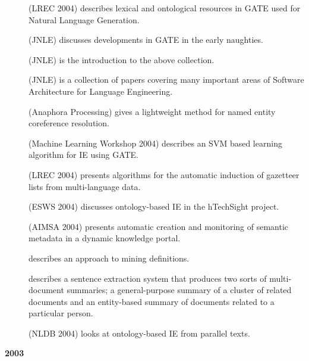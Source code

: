 \begin{description}

\item[\cite{Bon04a}] (LREC 2004) describes lexical and ontological resources
in GATE used for Natural Language Generation.
%
\item[\cite{Bon04b}] (JNLE) discusses developments in GATE in the early
naughties.
%
\item[\cite{Cun04b}] (JNLE) is the introduction to the above collection.
%
\item[\cite{Cun04a}] (JNLE) is a collection of papers covering many
important areas of Software Architecture for Language Engineering.
%
\item[\cite{Dim04a}] (Anaphora Processing) gives a lightweight method for
named entity coreference resolution.
%
\item[\cite{Yaoyong04}] (Machine Learning Workshop 2004)
describes an SVM based learning algorithm for IE using GATE.
%
\item[\cite{May04a}] (LREC 2004) presents algorithms for the automatic
induction of gazetteer lists from multi-language data.
%
\item[\cite{May04c}] (ESWS 2004) discusses ontology-based IE in the
hTechSight project.
%
\item[\cite{May04b}]  (AIMSA 2004) presents automatic creation and
monitoring of semantic metadata in a dynamic knowledge portal.
%
\item[\cite{Saggion&Gaizauskas'04}] describes an approach to mining definitions.

\item[\cite{Saggion&Gaizauskas'04b}] describes a sentence extraction system that produces two sorts of multi-document summaries; a general-purpose summary of a cluster of related documents and an entity-based summary of documents related to a particular person.


\item[\cite{Wood04a}] (NLDB 2004) looks at ontology-based IE from parallel
texts.
%
\end{description}

\textbf{2003}

